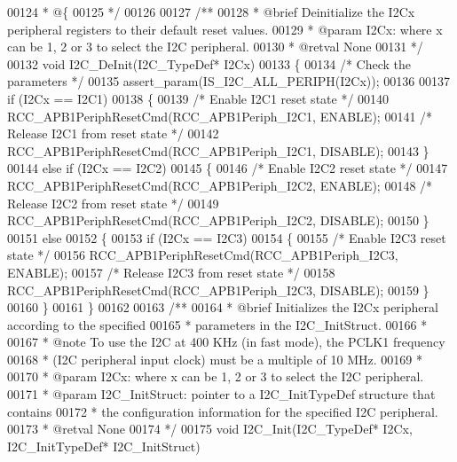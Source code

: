 \begin{DoxyCode}
00124 \textcolor{comment}{  * @\{}
00125 \textcolor{comment}{  */}
00126 
00127 \textcolor{comment}{/**}
00128 \textcolor{comment}{  * @brief  Deinitialize the I2Cx peripheral registers to their default reset values.}
00129 \textcolor{comment}{  * @param  I2Cx: where x can be 1, 2 or 3 to select the I2C peripheral.}
00130 \textcolor{comment}{  * @retval None}
00131 \textcolor{comment}{  */}
00132 \textcolor{keywordtype}{void} I2C_DeInit(I2C\_TypeDef* I2Cx)
00133 \{
00134   \textcolor{comment}{/* Check the parameters */}
00135   assert_param(IS\_I2C\_ALL\_PERIPH(I2Cx));
00136 
00137   \textcolor{keywordflow}{if} (I2Cx == I2C1)
00138   \{
00139     \textcolor{comment}{/* Enable I2C1 reset state */}
00140     RCC_APB1PeriphResetCmd(RCC_APB1Periph_I2C1, ENABLE);
00141     \textcolor{comment}{/* Release I2C1 from reset state */}
00142     RCC_APB1PeriphResetCmd(RCC_APB1Periph_I2C1, DISABLE);
00143   \}
00144   \textcolor{keywordflow}{else} \textcolor{keywordflow}{if} (I2Cx == I2C2)
00145   \{
00146     \textcolor{comment}{/* Enable I2C2 reset state */}
00147     RCC_APB1PeriphResetCmd(RCC_APB1Periph_I2C2, ENABLE);
00148     \textcolor{comment}{/* Release I2C2 from reset state */}
00149     RCC_APB1PeriphResetCmd(RCC_APB1Periph_I2C2, DISABLE);
00150   \}
00151   \textcolor{keywordflow}{else}
00152   \{
00153     \textcolor{keywordflow}{if} (I2Cx == I2C3)
00154     \{
00155       \textcolor{comment}{/* Enable I2C3 reset state */}
00156       RCC_APB1PeriphResetCmd(RCC_APB1Periph_I2C3, ENABLE);
00157       \textcolor{comment}{/* Release I2C3 from reset state */}
00158       RCC_APB1PeriphResetCmd(RCC_APB1Periph_I2C3, DISABLE);
00159     \}
00160   \}
00161 \}
00162 
00163 \textcolor{comment}{/**}
00164 \textcolor{comment}{  * @brief  Initializes the I2Cx peripheral according to the specified }
00165 \textcolor{comment}{  *         parameters in the I2C\_InitStruct.}
00166 \textcolor{comment}{  *           }
00167 \textcolor{comment}{  * @note   To use the I2C at 400 KHz (in fast mode), the PCLK1 frequency }
00168 \textcolor{comment}{  *         (I2C peripheral input clock) must be a multiple of 10 MHz.  }
00169 \textcolor{comment}{  *           }
00170 \textcolor{comment}{  * @param  I2Cx: where x can be 1, 2 or 3 to select the I2C peripheral.}
00171 \textcolor{comment}{  * @param  I2C\_InitStruct: pointer to a I2C\_InitTypeDef structure that contains }
00172 \textcolor{comment}{  *         the configuration information for the specified I2C peripheral.}
00173 \textcolor{comment}{  * @retval None}
00174 \textcolor{comment}{  */}
00175 \textcolor{keywordtype}{void} I2C_Init(I2C\_TypeDef* I2Cx, I2C\_InitTypeDef* I2C\_InitStruct)

\end{DoxyCode}
